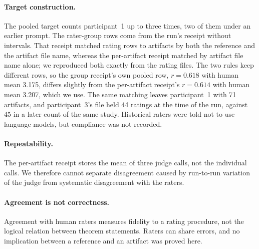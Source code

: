 \paragraph{Target construction.}
The pooled target counts participant~1 up to three times, two of them under an earlier prompt.
The rater-group rows come from the run's receipt without intervals.
That receipt matched rating rows to artifacts by both the reference and the artifact file name, whereas the per-artifact receipt matched by artifact file name alone; we reproduced both exactly from the rating files.
The two rules keep different rows, so the group receipt's own pooled row, $r=0.618$ with human mean 3.175, differs slightly from the per-artifact receipt's $r=0.614$ with human mean 3.207, which we use.
The same matching leaves participant~1 with 71 artifacts, and participant~3's file held 44 ratings at the time of the run, against 45 in a later count of the same study.
Historical raters were told not to use language models, but compliance was not recorded.

\paragraph{Repeatability.}
The per-artifact receipt stores the mean of three judge calls, not the individual calls.
We therefore cannot separate disagreement caused by run-to-run variation of the judge from systematic disagreement with the raters.

\paragraph{Agreement is not correctness.}
Agreement with human raters measures fidelity to a rating procedure, not the logical relation between theorem statements.
Raters can share errors, and no implication between a reference and an artifact was proved here.
